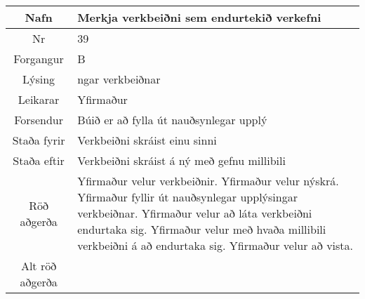 \documentclass[a4paper]{article}
\begin{document}
\begin{tabular}{|c|p{10cm}|}
\hline
Nafn&Merkja verkbeiðni sem endurtekið verkefni\\
\hline
Nr&39\\
\hline
Forgangur&B\\
\hline
Lýsing&ngar verkbeiðnar\\
\hline
Leikarar&Yfirmaður\\
\hline
Forsendur&Búið er að fylla út nauðsynlegar upplý\\
\hline
Staða fyrir&Verkbeiðni skráist einu sinni\\
\hline
Staða eftir&Verkbeiðni skráist á ný með gefnu millibili\\
\hline
Röð aðgerða&Yfirmaður velur verkbeiðnir. Yfirmaður velur nýskrá. Yfirmaður fyllir út nauðsynlegar upplýsingar verkbeiðnar. Yfirmaður velur að láta verkbeiðni endurtaka sig. Yfirmaður velur með hvaða millibili verkbeiðni á að endurtaka sig. Yfirmaður velur að vista.\\
\hline
Alt röð aðgerða&\\
\hline
\end{tabular}
\end{document}
